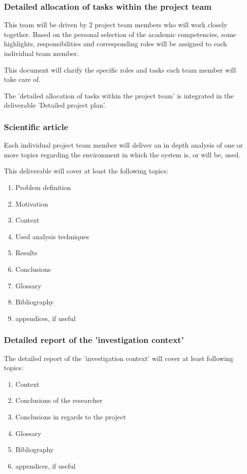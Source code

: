 \subsubsection{Detailed allocation of tasks within the project team}

This team will be driven by 2 project team members who will work closely together.
Based on the personal selection of the  academic competencies, some highlights, responsibilities and corresponding roles will be assigned to each individual team member. 

This document will clarify the specific roles and tasks each team member will take care of.

The 'detailed allocation of tasks within the project team' is integrated in the deliverable 'Detailed project plan'.

\subsubsection{Scientific article}

Each individual project team member will deliver an in depth analysis of one or more topics regarding the environment in which the system is, or will be, used. 

This deliverable will cover at least the following topics:

 	\begin{enumerate}
		\item Problem definition
		\item Motivation
		\item Context
		\item Used analysis techniques
		\item Results
		\item Conclusions
		\item Glossary
		\item Bibliography
		\item  appendices, if useful
	\end {enumerate}

\subsubsection{Detailed report of the 'investigation context'}

The detailed report of the 'investigation context' will cover at least following topics:

 	\begin{enumerate}
		\item Context
		\item Conclusions of the researcher
		\item Conclusions in regards to the project
		\item Glossary
		\item Bibliography
		\item  appendices, if useful
	\end {enumerate}

